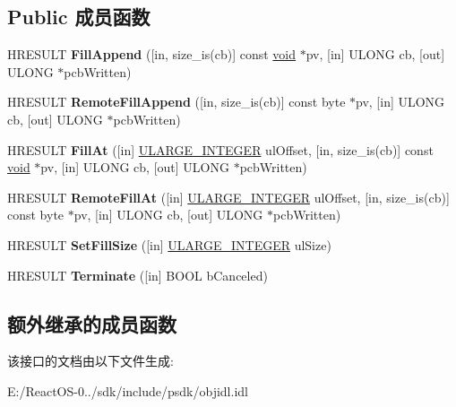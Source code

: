 \subsection*{Public 成员函数}
\begin{DoxyCompactItemize}
\item 
\mbox{\label{interface_i_fill_lock_bytes_aa36a49cb4a1fda875f823eafb7b11843}} 
H\+R\+E\+S\+U\+LT {\bfseries Fill\+Append} (\mbox{[}in, size\+\_\+is(cb)\mbox{]} const \hyperlink{interfacevoid}{void} $\ast$pv, \mbox{[}in\mbox{]} U\+L\+O\+NG cb, \mbox{[}out\mbox{]} U\+L\+O\+NG $\ast$pcb\+Written)
\item 
\mbox{\label{interface_i_fill_lock_bytes_a392101621f7fac73234dd37cecd87a11}} 
H\+R\+E\+S\+U\+LT {\bfseries Remote\+Fill\+Append} (\mbox{[}in, size\+\_\+is(cb)\mbox{]} const byte $\ast$pv, \mbox{[}in\mbox{]} U\+L\+O\+NG cb, \mbox{[}out\mbox{]} U\+L\+O\+NG $\ast$pcb\+Written)
\item 
\mbox{\label{interface_i_fill_lock_bytes_a82e5d73203ac49ca0d4f1db37cf2d139}} 
H\+R\+E\+S\+U\+LT {\bfseries Fill\+At} (\mbox{[}in\mbox{]} \hyperlink{struct___u_l_a_r_g_e___i_n_t_e_g_e_r}{U\+L\+A\+R\+G\+E\+\_\+\+I\+N\+T\+E\+G\+ER} ul\+Offset, \mbox{[}in, size\+\_\+is(cb)\mbox{]} const \hyperlink{interfacevoid}{void} $\ast$pv, \mbox{[}in\mbox{]} U\+L\+O\+NG cb, \mbox{[}out\mbox{]} U\+L\+O\+NG $\ast$pcb\+Written)
\item 
\mbox{\label{interface_i_fill_lock_bytes_abda3ee8347efc5d0cdde0b099b8b5cea}} 
H\+R\+E\+S\+U\+LT {\bfseries Remote\+Fill\+At} (\mbox{[}in\mbox{]} \hyperlink{struct___u_l_a_r_g_e___i_n_t_e_g_e_r}{U\+L\+A\+R\+G\+E\+\_\+\+I\+N\+T\+E\+G\+ER} ul\+Offset, \mbox{[}in, size\+\_\+is(cb)\mbox{]} const byte $\ast$pv, \mbox{[}in\mbox{]} U\+L\+O\+NG cb, \mbox{[}out\mbox{]} U\+L\+O\+NG $\ast$pcb\+Written)
\item 
\mbox{\label{interface_i_fill_lock_bytes_a007434bbf0751600fff6316f004a15d5}} 
H\+R\+E\+S\+U\+LT {\bfseries Set\+Fill\+Size} (\mbox{[}in\mbox{]} \hyperlink{struct___u_l_a_r_g_e___i_n_t_e_g_e_r}{U\+L\+A\+R\+G\+E\+\_\+\+I\+N\+T\+E\+G\+ER} ul\+Size)
\item 
\mbox{\label{interface_i_fill_lock_bytes_aee179872e3bea0eee752aa5cf773872c}} 
H\+R\+E\+S\+U\+LT {\bfseries Terminate} (\mbox{[}in\mbox{]} B\+O\+OL b\+Canceled)
\end{DoxyCompactItemize}
\subsection*{额外继承的成员函数}


该接口的文档由以下文件生成\+:\begin{DoxyCompactItemize}
\item 
E\+:/\+React\+O\+S-\/0../sdk/include/psdk/objidl.\+idl\end{DoxyCompactItemize}
